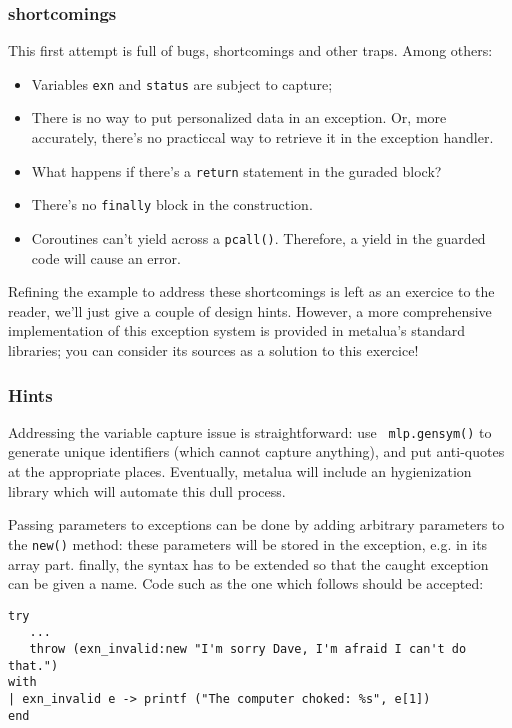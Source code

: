 \subsubsection{shortcomings}
This first attempt is full of bugs, shortcomings and other
traps. Among others:
\begin{itemize}
\item Variables {\tt exn} and {\tt status} are subject to capture;
\item There is no way to put personalized data in an exception. Or,
  more accurately, there's no practiccal way to retrieve it in the
  exception handler.
\item What happens if there's a {\tt return} statement in the guraded
  block?
\item There's no {\tt finally} block in the construction.
\item Coroutines can't yield across a {\tt pcall()}. Therefore, a
yield in the guarded code will cause an error.
\end{itemize}

Refining the example to address these shortcomings is left as an
exercice to the reader, we'll just give a couple of design
hints. However, a more comprehensive implementation of this exception
system is provided in metalua's standard libraries; you can consider
its sources as a solution to this exercice!

\subsubsection{Hints}
Addressing the variable capture issue is straightforward: use {\tt
  mlp.gensym()} to generate unique identifiers (which cannot capture
anything), and put anti-quotes at the appropriate places. Eventually,
metalua will include an hygienization library which will automate this
dull process. 

Passing parameters to exceptions can be done by adding arbitrary
parameters to the {\tt new()} method: these parameters will be stored
in the exception, e.g. in its array part. finally, the
syntax has to be extended so that the caught exception can be given a
name. Code such as the one which follows should be accepted:

\begin{verbatim}
try
   ...
   throw (exn_invalid:new "I'm sorry Dave, I'm afraid I can't do that.")
with
| exn_invalid e -> printf ("The computer choked: %s", e[1])
end
\end{verbatim}

